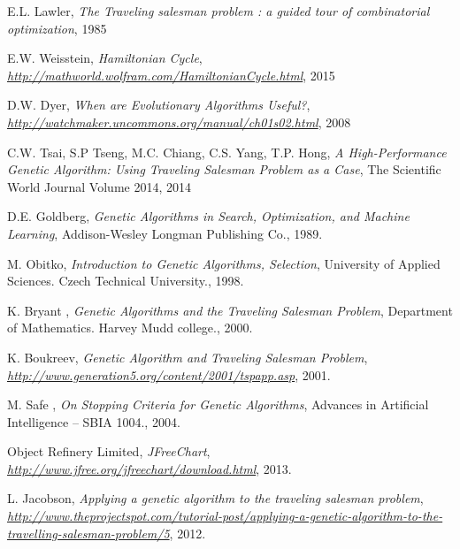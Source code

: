 \documentclass[article]{IEEEtran}
\begin{document}
\begin{thebibliography}{9}

E.L. Lawler, \textit{The Traveling salesman problem : a guided tour of combinatorial optimization},
1985

E.W. Weisstein, \textit{Hamiltonian Cycle},
\textit{\url{http://mathworld.wolfram.com/HamiltonianCycle.html}}, 2015

D.W. Dyer, \textit{When are Evolutionary Algorithms Useful?},
\textit{\url{http://watchmaker.uncommons.org/manual/ch01s02.html}}, 2008

C.W. Tsai, S.P Tseng, M.C. Chiang, C.S. Yang, T.P. Hong, \textit{A High-Performance Genetic Algorithm: Using Traveling Salesman Problem as a Case},
The Scientific World Journal Volume 2014, 2014

D.E. Goldberg, \textit{Genetic Algorithms in Search, Optimization, and Machine Learning},
Addison-Wesley Longman Publishing Co., 1989. 

M. Obitko, \textit{Introduction to Genetic Algorithms, Selection},
University of Applied Sciences. Czech Technical University., 1998. 

K. Bryant , \textit{Genetic Algorithms and the Traveling Salesman Problem},
Department of Mathematics. Harvey Mudd college., 2000. 

K. Boukreev, \textit{Genetic Algorithm and Traveling Salesman Problem},
\textit{\url{http://www.generation5.org/content/2001/tspapp.asp}}, 2001.

M. Safe , \textit{On Stopping Criteria for Genetic Algorithms},
Advances in Artificial Intelligence – SBIA 1004., 2004. 

Object Refinery Limited, \textit{JFreeChart},
\textit{\url{http://www.jfree.org/jfreechart/download.html}}, 2013.

L. Jacobson, \textit{Applying a genetic algorithm to the traveling salesman problem},
\textit{\url{http://www.theprojectspot.com/tutorial-post/applying-a-genetic-algorithm-to-the-travelling-salesman-problem/5}}, 2012.

\end{thebibliography}
\end{document}

